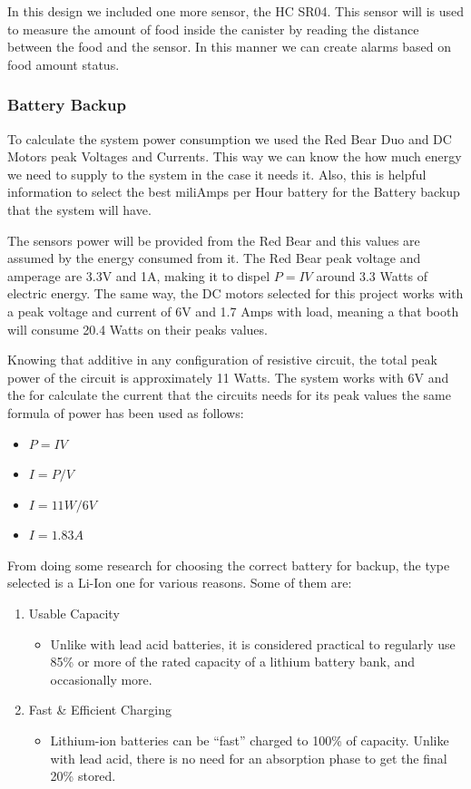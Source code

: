 \documentclass[12pt]{article}
\begin{document}
In this design we included one more sensor, the HC SR04. This sensor will is used to measure the amount of food inside the canister by reading the distance between the food and the sensor. In this manner we can create alarms based on food amount status.

\subsubsection{Battery Backup}

To calculate the system power consumption we used the Red Bear Duo and DC Motors peak Voltages and Currents. This way we can know the how much energy we need to supply to the system in the case it needs it. Also, this is helpful information to select the best miliAmps per Hour battery for the Battery backup that the system will have.

The sensors power will be provided from the Red Bear and this values are assumed by the energy consumed from it. The Red Bear peak voltage and amperage are 3.3V and 1A, making it to dispel \(P = IV\) around 3.3 Watts of electric energy. The same way, the DC motors selected for this project works with a peak voltage and current of 6V and 1.7 Amps with load, meaning a that booth will consume 20.4 Watts on their peaks values.

Knowing that additive in any configuration of resistive circuit, the total peak power of the circuit is approximately 11 Watts. The system works with 6V and the for calculate the current that the circuits needs for its peak values the same formula of power\cite{AllAboutCircuits} has been used as follows:

\begin{itemize}
  \item \(P = IV\)
  \item \(I = P/V\)
  \item \(I = 11W/6V\)
  \item \(I = 1.83A\)
\end{itemize}

From doing some research for choosing the correct battery for backup, the type selected is a Li-Ion one for various reasons. Some of them are:

\begin{enumerate}
  \item Usable Capacity

  \begin{itemize}
    \item Unlike with lead acid batteries, it is considered practical to regularly use 85\% or more of the rated capacity of a lithium battery bank, and occasionally more.
  \end{itemize}

  \item Fast \& Efficient Charging
  \begin{itemize}
    \item Lithium-ion batteries can be “fast” charged to 100\% of capacity. Unlike with lead acid, there is no need for an absorption phase to get the final 20\% stored.
  \end{itemize}
\end{enumerate}
\end{document}
